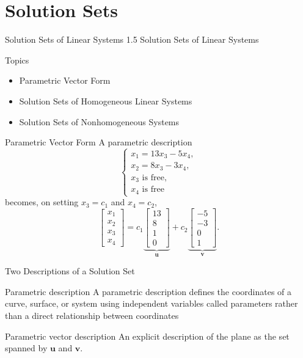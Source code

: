 
\section{Solution Sets}
\begin{frame}{Solution Sets of Linear Systems}
  \centering
  \Large 1.5 Solution Sets of Linear Systems
\end{frame}

\begin{frame}{Topics}
  \begin{itemize}
    \item Parametric Vector Form
    \item Solution Sets of Homogeneous Linear Systems
    \item Solution Sets of Nonhomogeneous Systems
  \end{itemize}
\end{frame}

\begin{frame}{Parametric Vector Form}
  A parametric description
  \[
    \begin{cases}
      x_1=13x_3-5x_4,\\
      x_2=8x_3-3x_4,\\
      x_3\text{ is free},\\
      x_4\text{ is free}
    \end{cases}
  \]
  becomes, on setting $x_3=c_1$ and $x_4=c_2$,
  \[
    \begin{bmatrix}x_1\\x_2\\x_3\\x_4\end{bmatrix}
    =c_1\underbrace{\begin{bmatrix}13\\8\\1\\0\end{bmatrix}}_{\mathbf{u}}
     +c_2\underbrace{\begin{bmatrix}-5\\-3\\0\\1\end{bmatrix}}_{\mathbf{v}}.
  \]
\end{frame}

\begin{frame}{Two Descriptions of a Solution Set}
  \begin{block}{Parametric description}
    A parametric description defines the coordinates of a curve, surface, or system using independent variables called parameters rather than a direct relationship between coordinates
  \end{block}
  \begin{block}{Parametric vector description}
    An explicit description of the plane as the set spanned by
    $\mathbf{u}$ and $\mathbf{v}$.
  \end{block}
\end{frame}


